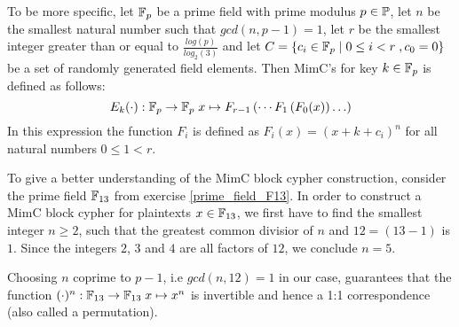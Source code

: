 To be more specific, let $\mathbb{F}_p$ be a prime field with prime modulus $p\in\mathbb{P}$, let $n$ be the smallest natural number such that $gcd(n, p-1) = 1$, let $r$ be the smallest integer greater than or equal to $\frac{log(p)}{log_2(3)}$  and let $C=\{c_i\in \mathbb{F}_p \;|\; 0\leq i < r\; , c_0 =0 \}$ be a set of randomly generated field elements. Then MimC's  for key $k\in \mathbb{F}_p$ is defined as follows: 
\begin{equation}
\label{def:mimc-block-cypher}
E_k(\cdot): \mathbb{F}_p \to \mathbb{F}_p\; x \mapsto F_{r-1}\left(\cdots F_1\left(F_0(x)\right)\ldots\right)
\end{equation}
In this expression the function $F_i$ is defined as $F_i(x)= (x+k+c_i)^n$ for all natural numbers $0\leq 1 < r$.
\begin{example}
\label{ex:mimc-block-cypher-f13}
 To give a better understanding of the MimC block cypher construction, consider the prime field $\mathbb{F}_{13}$ from exercise \ref{prime_field_F13}. In order to construct a MimC block cypher for plaintexts $x\in \mathbb{F}_{13}$, we first have to find the smallest integer $n\geq 2$, such that the greatest common divisior of $n$ and $12=(13-1)$ is $1$. Since the integers $2$, $3$ and $4$ are all factors of $12$, we conclude $n=5$. 

Choosing $n$ coprime to $p-1$, i.e $gcd(n,12)=1$ in our case, guarantees that the function $(\cdot)^n: \mathbb{F}_{13}\to \mathbb{F}_{13}\; x \mapsto x^n$ is invertible and hence a 1:1 correspondence (also called a permutation).


\end{example}
